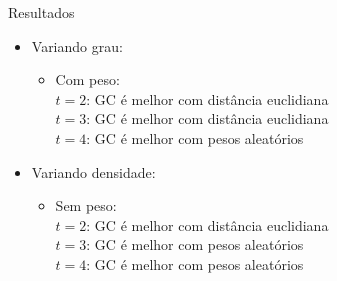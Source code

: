 \documentclass[dvipsnames]{beamer}
\begin{document}
\begin{frame}{Resultados}
  \begin{itemize}
  \item Variando grau:
    \begin{itemize}
    \item Com peso:\\
      $t = 2$: GC é melhor com distância euclidiana\\
      $t = 3$: GC é melhor com distância euclidiana\\
      $t = 4$: GC é melhor com pesos aleatórios
    \end{itemize}
  \item <2->Variando densidade:
    \begin{itemize}
      \item <2->Sem peso:\\
        $t = 2$: GC é melhor com distância euclidiana\\
        $t = 3$: GC é melhor com pesos aleatórios\\
        $t = 4$: GC é melhor com pesos aleatórios
      \end{itemize}
    \end{itemize}
  \end{frame}


\end{document}
